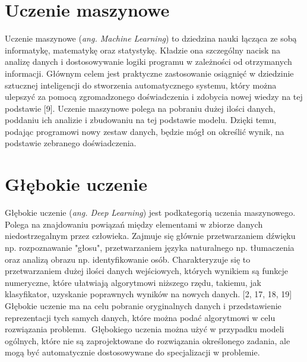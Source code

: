 \documentclass[openright]{xmgr}
\begin{document}
\section{Uczenie maszynowe}

\indent \indent Uczenie maszynowe (\textit{ang. Machine Learning}) to dziedzina nauki łącząca ze sobą informatykę, matematykę oraz statystykę. Kładzie ona szczególny nacisk na analizę danych i dostosowywanie logiki programu w zależności od otrzymanych informacji. Głównym celem jest praktyczne zastosowanie osiągnięć w dziedzinie sztucznej inteligencji do stworzenia automatycznego systemu, który można ulepszyć za pomocą zgromadzonego doświadczenia i zdobycia nowej wiedzy na tej podstawie [9]. Uczenie maszynowe polega na pobraniu dużej ilości danych, poddaniu ich analizie i zbudowaniu na tej podstawie modelu. Dzięki temu, podając programowi nowy zestaw danych, będzie mógł on określić wynik, na podstawie zebranego doświadczenia. 

\section{Głębokie uczenie }

\indent \indent Głębokie uczenie (\textit{ang. Deep Learning}) jest podkategorią uczenia maszynowego. Polega na znajdowaniu powiązań między elementami w zbiorze danych niedostrzegalnym przez człowieka. Zajmuje się głównie przetwarzaniem dźwięku np. rozpoznawanie "głosu", przetwarzaniem języka naturalnego np. tłumaczenia oraz analizą obrazu np. identyfikowanie osób. Charakteryzuje się to przetwarzaniem dużej ilości danych wejściowych, których wynikiem są funkcje numeryczne, które ułatwiają algorytmowi niższego rzędu, takiemu, jak klasyfikator, uzyskanie poprawnych wyników na nowych danych. [2, 17, 18, 19] Głębokie uczenie ma na celu pobranie oryginalnych danych i przedstawienie reprezentacji tych samych danych, które można podać algorytmowi w celu rozwiązania problemu. 
􏰁Głębokiego uczenia można użyć w przypadku modeli ogólnych, które nie są zaprojektowane do rozwiązania określonego zadania, ale mogą być automatycznie dostosowywane do specjalizacji w problemie.
\end{document}
